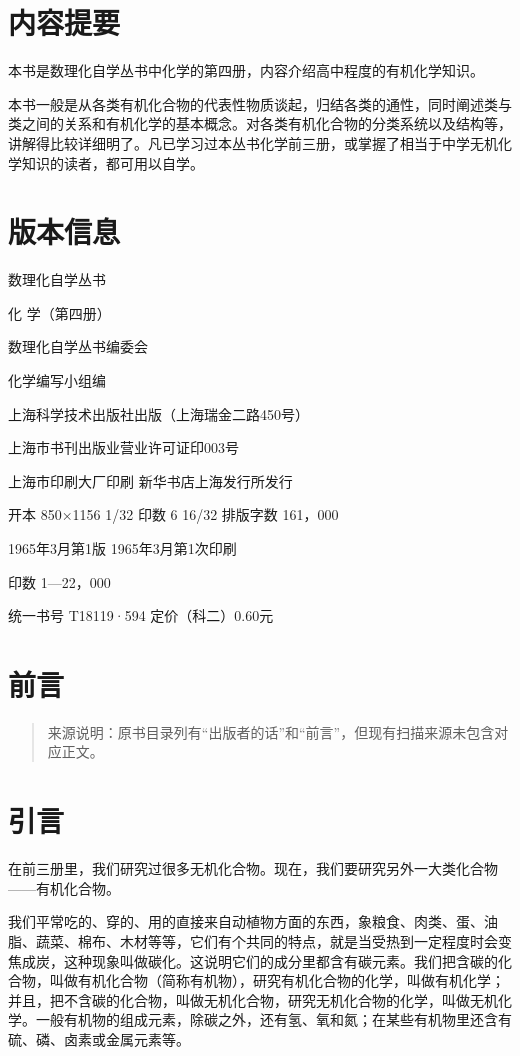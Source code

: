 \chapter*{内容提要}

本书是数理化自学丛书中化学的第四册，内容介绍高中程度的有机化学知识。

本书一般是从各类有机化合物的代表性物质谈起，归结各类的通性，同时阐述类与类之间的关系和有机化学的基本概念。对各类有机化合物的分类系统以及结构等，讲解得比较详细明了。凡已学习过本丛书化学前三册，或掌握了相当于中学无机化学知识的读者，都可用以自学。

\chapter*{版本信息}

数理化自学丛书

化 学（第四册）

数理化自学丛书编委会

化学编写小组编

上海科学技术出版社出版（上海瑞金二路450号）

上海市书刊出版业营业许可证印003号

上海市印刷大厂印刷 新华书店上海发行所发行

开本 850×1156 1/32 印数 6 16/32 排版字数 161，000

1965年3月第1版 1965年3月第1次印刷

印数 1---22，000

统一书号 T18119·594 定价（科二）0.60元

\chapter{前言}

\begin{quote}
来源说明：原书目录列有``出版者的话''和``前言''，但现有扫描来源未包含对应正文。
\end{quote}

\chapter{引言}

在前三册里，我们研究过很多无机化合物。现在，我们要研究另外一大类化合物------有机化合物。

我们平常吃的、穿的、用的直接来自动植物方面的东西，象粮食、肉类、蛋、油脂、蔬菜、棉布、木材等等，它们有个共同的特点，就是当受热到一定程度时会变焦成炭，这种现象叫做碳化。这说明它们的成分里都含有碳元素。我们把含碳的化合物，叫做有机化合物（简称有机物），研究有机化合物的化学，叫做有机化学；并且，把不含碳的化合物，叫做无机化合物，研究无机化合物的化学，叫做无机化学。一般有机物的组成元素，除碳之外，还有氢、氧和氮；在某些有机物里还含有硫、磷、卤素或金属元素等。

